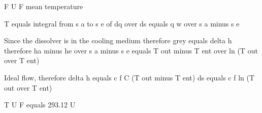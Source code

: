 F U F mean temperature

T equals integral from s a to s e of dq over ds equals q w over s a minus s e

Since the dissolver is in the cooling medium
therefore grey equals delta h
therefore ha minus he over s a minus s e equals T out minus T ent over ln (T out over T ent)

Ideal flow, therefore
delta h equals c f C (T out minus T ent)
ds equals c f ln (T out over T ent)

T U F equals 293.12 U